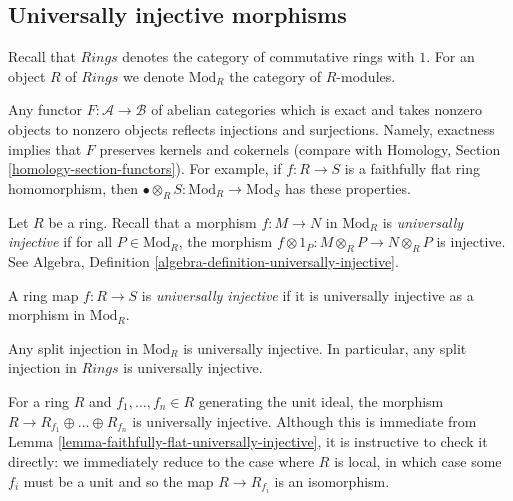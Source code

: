 \subsection{Universally injective morphisms}
\label{subsection-universally-injective}

\noindent
Recall that $\textit{Rings}$ denotes the category of commutative rings
with $1$. For an object $R$ of $\textit{Rings}$ we denote $\text{Mod}_R$
the category of $R$-modules.

\begin{remark}
\label{remark-reflects}
Any functor $F : \mathcal{A} \to \mathcal{B}$ of abelian categories
which is exact and takes nonzero objects to nonzero objects reflects
injections and surjections. Namely, exactness implies that
$F$ preserves kernels and cokernels (compare with
Homology, Section \ref{homology-section-functors}).
For example, if $f : R \to S$ is a 
faithfully flat ring homomorphism, then
$\bullet \otimes_R S: \text{Mod}_R \to \text{Mod}_S$ has these properties.
\end{remark}

\noindent
Let $R$ be a ring. Recall that a morphism $f : M \to N$ in $\text{Mod}_R$
is {\it universally injective} if for all $P \in \text{Mod}_R$,
the morphism $f \otimes 1_P: M \otimes_R P \to N \otimes_R P$ is injective.
See Algebra, Definition \ref{algebra-definition-universally-injective}.

\begin{definition}
\label{definition-universally-injective}
A ring map $f: R \to S$ is {\it universally injective}
if it is universally injective as a morphism in $\text{Mod}_R$.
\end{definition}

\begin{example}
\label{example-split-injection-universally-injective}
Any split injection in $\text{Mod}_R$ is universally injective. In particular,
any split injection in $\textit{Rings}$ is universally injective.
\end{example}

\begin{example}
\label{example-cover-universally-injective}
For a ring $R$ and $f_1, \ldots, f_n \in R$ generating the unit
ideal, the morphism $R \to R_{f_1} \oplus \ldots \oplus R_{f_n}$ is
universally injective. Although this is immediate from
Lemma \ref{lemma-faithfully-flat-universally-injective},
it is instructive to check it directly: we immediately reduce to the case
where $R$ is local, in which case some $f_i$ must be a unit and so the map
$R \to R_{f_i}$ is an isomorphism.
\end{example}

